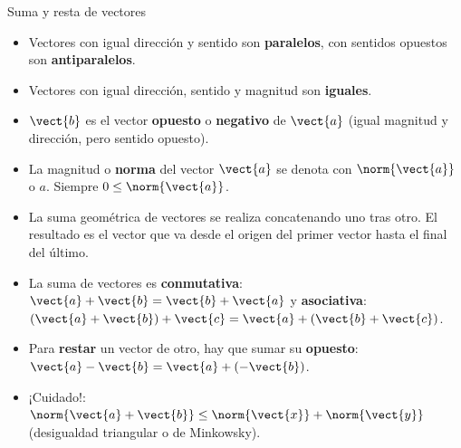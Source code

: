\documentclass[9pt, aspectratio=169]{beamer}
\begin{document}
\begin{frame}{Suma y resta de vectores}
    \begin{center}
        
    \end{center}
\begin{itemize}
    \item Vectores con igual dirección y sentido son \textbf{paralelos}, con sentidos opuestos son \textbf{antiparalelos}.
    \item Vectores con igual dirección, sentido y magnitud son \textbf{iguales}.
    \item $\vect{b}$ es el vector \textbf{opuesto} o \textbf{negativo} de $\vect{a}$ (igual magnitud y dirección, pero sentido opuesto).
    \item La magnitud o \textbf{norma} del vector $\vect{a}$ se denota con $\norm{\vect{a}}$ o $a$. Siempre $0 \leq \norm{\vect{a}}$.
    \item La suma geométrica de vectores se realiza concatenando uno tras otro. El resultado es el vector que va desde el origen del primer vector hasta el final del último.
    \item La suma de vectores es \textbf{conmutativa}: $\vect{a} + \vect{b} = \vect{b} + \vect{a}$ y \textbf{asociativa}: $(\vect{a} + \vect{b}) + \vect{c} = \vect{a} + (\vect{b} + \vect{c})$.
    \item Para \textbf{restar} un vector de otro, hay que sumar su \textbf{opuesto}: $\vect{a} - \vect{b} = \vect{a} + (-\vect{b})$.
    \item \alert{¡Cuidado!:} $ \norm{\vect{a} + \vect{b}} \leq \norm{\vect{x}} + \norm{\vect{y}}$ (desigualdad triangular o de Minkowsky). 
\end{itemize}
\end{frame}
\end{document}
